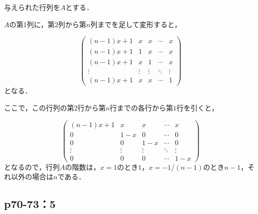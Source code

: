 \documentclass[uplatex,dvipdfmx,a4paper,10pt,fleqn]{jsarticle}
\begin{document}
\begin{leftbar}
    与えられた行列を$A$とする．

    $A$の第1列に，第2列から第$n$列までを足して変形すると，

    \[
        \begin{pmatrix} 
            (n-1)x+1 & x & x&  \cdots & x \\
            (n-1)x+1 & 1 & x & \cdots & x \\
            (n-1)x+1 & x & 1 &  \cdots & x \\
            \vdots & \vdots & \vdots & \ddots & \vdots \\
            (n-1)x+1 & x & x& \cdots & 1 
        \end{pmatrix}
    \]
    となる．

    ここで，この行列の第$2$行から第$n$行までの各行から第$1$行を引くと，

    \[
    \begin{pmatrix} 
        (n-1)x+1 & x & x&  \cdots & x \\
        0 & 1-x & 0 & \cdots & 0 \\
        0  & 0 & 1-x &  \cdots & 0 \\
        \vdots & \vdots & \vdots & \ddots & \vdots \\
        0 & 0 & 0& \cdots & 1 -x 
    \end{pmatrix}
    \]
    となるので，行列$A$の階数は，$x=1$のとき$1$，$ x= -1/(n-1)$のとき$n-1$，それ以外の場合は$n$である．
\end{leftbar}


    \newpage 

    \subsection*{p70-73：5}
    
\end{document}
